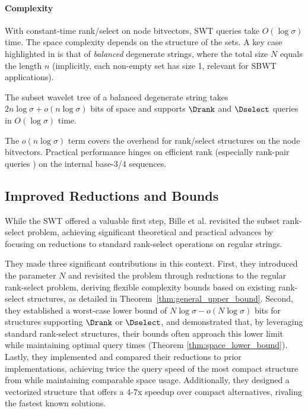 \paragraph{Complexity} With constant-time rank/select on node bitvectors, SWT queries take $O(\log \sigma)$ time. The space complexity depends on the structure of the sets. A key case highlighted in \cite{SubsetWT} is that of \emph{balanced} degenerate strings, where the total size $N$ equals the length $n$ (implicitly, each non-empty set has size 1, relevant for SBWT applications).

\begin{theorem} \label{thm:swt_space_balanced}
    The subset wavelet tree of a balanced degenerate string takes $2n \log \sigma + o(n \log \sigma)$ bits of space and supports $\Drank$ and $\Dselect$ queries in $O(\log \sigma)$ time.
\end{theorem}
The $o(n \log \sigma)$ term covers the overhead for rank/select structures on the node bitvectors. Practical performance hinges on efficient rank (especially rank-pair queries \cite{SubsetWT}) on the internal base-3/4 sequences.


\subsection{Improved Reductions and Bounds}
\label{sec:degenerate_string_better}

While the SWT offered a valuable first step, Bille et al. \cite{bille2023rank} revisited the subset rank-select problem, achieving significant theoretical and practical advances by focusing on reductions to standard rank-select operations on regular strings.

\noindent They made three significant contributions in this context. First, they introduced the parameter $N$ and revisited the problem through reductions to the regular rank-select problem, deriving flexible complexity bounds based on existing rank-select structures, as detailed in Theorem~\ref{thm:general_upper_bound}. Second, they established a worst-case lower bound of $N\log \sigma - o(N\log \sigma)$ bits for structures supporting $\Drank$ or $\Dselect$, and demonstrated that, by leveraging standard rank-select structures, their bounds often approach this lower limit while maintaining optimal query times (Theorem \ref{thm:space_lower_bound}). Lastly, they implemented and compared their reductions to prior implementations, achieving twice the query speed of the most compact structure from \cite{SubsetWT} while maintaining comparable space usage. Additionally, they designed a vectorized structure that offers a 4-7x speedup over compact alternatives, rivaling the fastest known solutions.

